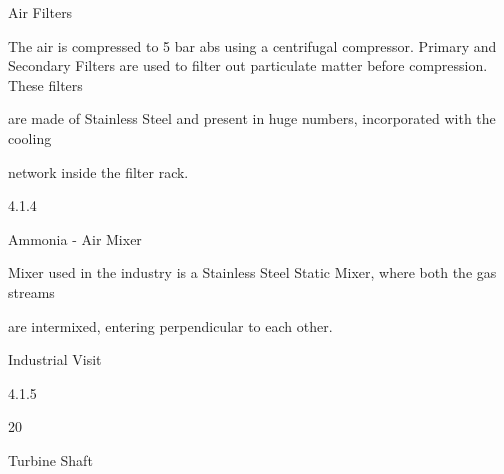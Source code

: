 \documentclass[a4paper,portrait,12pt]{article}
\begin{document}
\begin{flushleft}
Air Filters
\end{flushleft}





\begin{flushleft}
The air is compressed to 5 bar abs using a centrifugal compressor. Primary and Secondary Filters are used to filter out particulate matter before compression. These filters
\end{flushleft}


\begin{flushleft}
are made of Stainless Steel and present in huge numbers, incorporated with the cooling
\end{flushleft}


\begin{flushleft}
network inside the filter rack.
\end{flushleft}





4.1.4





\begin{flushleft}
Ammonia - Air Mixer
\end{flushleft}





\begin{flushleft}
Mixer used in the industry is a Stainless Steel Static Mixer, where both the gas streams
\end{flushleft}


\begin{flushleft}
are intermixed, entering perpendicular to each other.
\end{flushleft}





\begin{flushleft}
\newpage
Industrial Visit
\end{flushleft}





4.1.5





20





\begin{flushleft}
Turbine Shaft
\end{flushleft}
\end{document}
